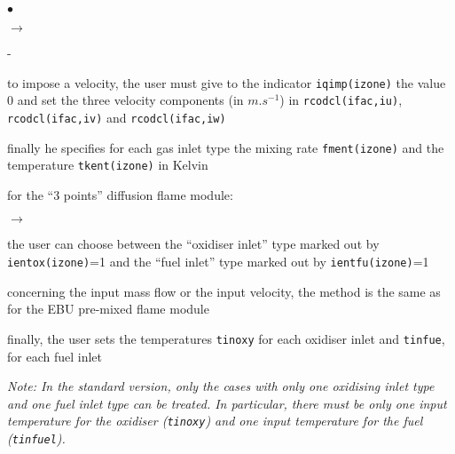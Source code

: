 {{\begin{list}{$\bullet$}{}
\begin{list}{$\rightarrow$}{}
\begin{list}{-}{}
                                 \item to impose a velocity, the user
                                       must give to the indicator
                                       \texttt{iqimp(izone)} the value 0 and set
                                       the three velocity components (in
                                       $m.s^{-1}$) in
                                       \texttt{rcodcl(ifac,iu)},
                                       \texttt{rcodcl(ifac,iv)} and
                                       \texttt{rcodcl(ifac,iw)}
                          \end{list}
                    \item finally he specifies for each gas inlet type
                          the mixing rate \texttt{fment(izone)} and
                          the temperature \texttt{tkent(izone)} in Kelvin
             \end{list}

       \item for the ``3 points'' diffusion flame module:
             \begin{list}{$\rightarrow$}{}
                    \item the user can choose between the ``oxidiser
                          inlet'' type marked out by
                          \texttt{ientox(izone)}=1 and the ``fuel
                          inlet'' type marked out by
                          \texttt{ientfu(izone)}=1
                    \item concerning the input mass flow or the input
                          velocity, the method is the same as for the
                          EBU pre-mixed flame module
                    \item finally, the user sets the temperatures
                          \texttt{tinoxy} for each oxidiser inlet
                          and \texttt{tinfue}, for each fuel inlet

{\em Note: In the standard version, only the cases with only one
                          oxidising inlet type and one fuel inlet type
                          can be treated. In particular, there must be
                          only one input temperature for the oxidiser
                          (\texttt{tinoxy}) and one input temperature for the
                          fuel (\texttt{tinfuel}).}
             \end{list}


\end{list}}}
